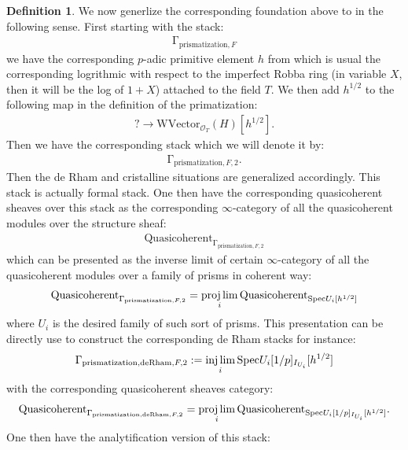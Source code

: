 \documentclass[12pt]{article}
\theoremstyle{definition}
\newtheorem{definition}{Definition}
\begin{document}
\begin{definition}
We now generlize the corresponding foundation above to \cite{BSB} in the following sense. First starting with the stack:
\begin{align}
\mathrm{\Gamma}_{\mathrm{prismatization},F}
\end{align}
we have the corresponding $p$-adic primitive element $h$ from \cite{BSB} which is usual the corresponding logrithmic with respect to the imperfect Robba ring (in variable $X$, then it will be the log of $1+X$) attached to the field $T$. We then add $h^{1/2}$ to the following map in the definition of the primatization:
\begin{align}
?\rightarrow \mathrm{WVector}_{\mathcal{O}_T}(H)[h^{1/2}].
\end{align}
Then we have the corresponding stack which we will denote it by:
\begin{align}
\mathrm{\Gamma}_{\mathrm{prismatization},F,2}.
\end{align}
Then the de Rham and cristalline situations are generalized accordingly. This stack is actually formal stack. One then have the corresponding quasicoherent sheaves over this stack as the corresponding $\infty$-category of all the quasicoherent modules over the structure sheaf:
\begin{align}
\mathrm{Quasicoherent}_{\mathrm{\Gamma}_{\mathrm{prismatization},F,2}}
\end{align}
which can be presented as the inverse limit of certain $\infty$-category of all the quasicoherent modules over a family of prisms in coherent way:
\begin{align}
\mathrm{Quasicoherent}_{\mathrm{\Gamma}_{\mathrm{prismatization},F,2}}=\projlim_i \mathrm{Quasicoherent}_{\mathrm{Spec}U_i[h^{1/2}]}
\end{align}
where $U_i$ is the desired family of such sort of prisms. This presentation can be directly use to construct the corresponding de Rham stacks for instance:
\begin{align}
\mathrm{\Gamma}_{\mathrm{prismatization},\mathrm{deRham},F,2}:=\injlim_i \mathrm{Spec}U_i[1/p]_{I_{U_i}}[h^{1/2}]
\end{align}
with the corresponding quasicoherent sheaves category:
\begin{align}
\mathrm{Quasicoherent}_{\mathrm{\Gamma}_{\mathrm{prismatization},\mathrm{deRham},F,2}}=\projlim_i \mathrm{Quasicoherent}_{\mathrm{Spec}U_i[1/p]_{I_{U_i}}[h^{1/2}]}.
\end{align}
One then have the analytification version of this stack:

\end{definition}
\end{document}
